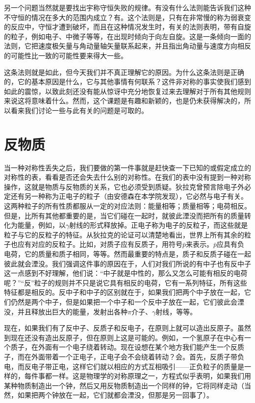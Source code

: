 另一个问题当然就是要找出宇称守恒失败的规律。有没有什么法则能告诉我们这种不守恒的情况在多大的范围内成立？有。这个法则是，只有在非常慢的称为弱衰变的反应中，守恒才遭到破坏，而且在这种情况发生时，有关的法则表明，带有自旋的粒子，例如电子、中微子等等，在出现时倾向于向左自旋。这是一条倾向一面的法则，它把速度极矢量与角动量轴矢量联系起来，并且指出角动量与速度方向相反的可能性比一致的可能性要来得大一些。

这条法则就是如此，但今天我们并不真正理解它的原因。为什么这条法则是正确的，它的基本原因是什么，它与其他事情有何联系？这件非对称的事实使我们感到如此的震惊，以致此刻还没有能从惊讶中充分地恢复过来去理解对于所有其他规则来说这将意味着什么。然而，这个课题是有趣和新颖的，也是仍未获得解决的，所以看来我们讨论一些与此有关的问题是可取的。

\section{反物质}

当一种对称性丢失之后，我们要做的第一件事就是赶快查一下已知的或假定成立的对称性的表，看看是否还会失去什么别的对称性。在我们的表中没有提到一种对称操作，这就是物质与反物质的关系，它也必须受到质疑。狄拉克曾预言除电子外必定还有另一种称为正电子的粒子（由安德森在本学院发现），它必然与电子有关。这两种粒子的所有性质都服从一定的对应法则：能量相等；质量相等；电荷相反。但是，比所有其他都重要的是，当它们碰在一起时，就彼此湮没而把所有的质量转化为能量，例如，以$\gamma$射线的形式释放掉。正电子称为电子的反粒子，而这些就是粒子与它的反粒子的特征。从狄拉克的论证可以清楚地看出，世界上所有其余的粒子也应有对应的反粒子。比如，对质子应有反质子，用符号$\bar{p}$来表示。$\bar{p}$应具有负电荷，它的质量和质子相同，等等。然而最重要的特点是，质子和反质子碰在一起彼此就会湮没。我们强调这件事的原因在于，人们对我们所说的有中子也有反中子这一点感到不好理解，他们说：“中子就是中性的，那么又怎么可能有相反的电荷呢？”“反”粒子的规则并不只是说它具有相反的电荷，它有一系列特征，所有这些特征都是相反的。反中子和中子的区别就在于，如果我们把两个中子放在一起，它们仍然是两个中子，但是如果把一个中子和一个反中子放在一起，它们彼此会湮没，并且释放出巨大的能量，发射出各种$\pi$介子、$\gamma$射线，等等。

现在，如果我们有了反中子、反质子和反电子，在原则上就可以造出反原子。虽然到现在还没有造出反原子，但在原则上这是可能的。例如，一个氢原子在中心有一个质子，在外面有一个电子绕着转动。现在设想在某个地方我们能产生一个反质子，而在外面带着一个正电子，正电子会不会绕着转动？会。首先，反质子带负电，而反电子带正电，这样它们就以相应的方式互相吸引——正负粒子的质量是一样的，每件事都一样。这是物理学的对称原理之一，方程式似乎表明，如果我们用某种物质制造出一个钟，然后又用反物质制造出一个同样的钟，它将同样走动（当然，如果把两个钟放在一起，它们就都会湮没，但那是另一回事了）。

